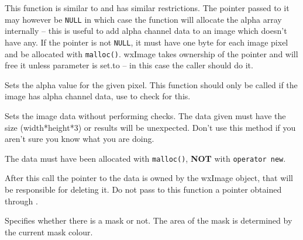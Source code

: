 

\label{wximagesetalpha}


This function is similar to  and has similar
restrictions. The pointer passed to it may however be {\tt NULL} in which case
the function will allocate the alpha array internally -- this is useful to add
alpha channel data to an image which doesn't have any. If the pointer is not 
{\tt NULL}, it must have one byte for each image pixel and be allocated with 
{\tt malloc()}. wxImage takes ownership of the pointer and will free it unless
 parameter is set.to \true -- in this case the caller should
do it.


Sets the alpha value for the given pixel. This function should only be called
if the image has alpha channel data, use  to
check for this.


\label{wximagesetdata}


Sets the image data without performing checks. The data given must have
the size (width*height*3) or results will be unexpected. Don't use this
method if you aren't sure you know what you are doing.

The data must have been allocated with {\tt malloc()}, {\large {\bf NOT}} with
{\tt operator new}.

After this call the pointer to the data is owned by the wxImage object,
that will be responsible for deleting it.
Do not pass to this function a pointer obtained through
.


\label{wximagesetmask}


Specifies whether there is a mask or not. The area of the mask is determined by the current mask colour.


\label{wximagesetmaskcolour}



